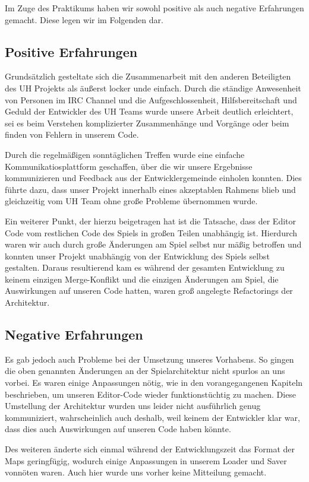 Im Zuge des Praktikums haben wir sowohl positive als auch negative Erfahrungen
gemacht. Diese legen wir im Folgenden dar.

\subsection{Positive Erfahrungen}
Grundsätzlich gesteltate sich die Zusammenarbeit mit den anderen Beteiligten
des UH Projekts als äußerst locker unde einfach. Durch die ständige Anwesenheit
von Personen im IRC Channel und die Aufgeschlossenheit, Hilfsbereitschaft und
Geduld der Entwickler des UH Teams wurde unsere Arbeit deutlich erleichtert,
sei es beim Verstehen komplizierter Zusammenhänge und Vorgänge oder beim
finden von Fehlern in unserem Code.

Durch die regelmäßigen sonntäglichen Treffen wurde eine einfache
Kommunikatiosplattform geschaffen, über die wir unsere Ergebnisse kommunizieren
und Feedback aus der Entwicklergemeinde einholen konnten. Dies führte dazu,
dass unser Projekt innerhalb eines akzeptablen Rahmens blieb und gleichzeitig
vom UH Team ohne große Probleme übernommen wurde.

Ein weiterer Punkt, der hierzu beigetragen hat ist die Tatsache, dass der
Editor Code vom restlichen Code des Spiels in großen Teilen unabhängig ist.
Hierdurch waren wir auch durch große Änderungen am Spiel selbst nur
mäßig betroffen und konnten unser Projekt unabhängig von der Entwicklung
des Spiels selbst gestalten. Daraus resultierend kam es während der gesamten
Entwicklung zu keinem einzigen Merge-Konflikt
und die einzigen Änderungen am Spiel, die Auswirkungen auf unseren Code hatten,
waren groß angelegte Refactorings der Architektur.

\subsection{Negative Erfahrungen}
Es gab jedoch auch Probleme bei der Umsetzung unseres Vorhabens.
So gingen die oben genannten Änderungen an der Spielarchitektur nicht spurlos
an uns vorbei. Es waren einige Anpassungen nötig, wie in den vorangegangenen Kapiteln
beschrieben, um unseren Editor-Code wieder funktionstüchtig zu machen.
Diese Umstellung der Architektur wurden uns leider nicht ausführlich genug
kommuniziert, wahrscheinlich auch deshalb, weil keinem der Entwickler klar war,
dass dies auch Auswirkungen auf unseren Code haben könnte.

Des weiteren änderte sich einmal während der Entwicklungszeit das Format der
Maps geringfügig, wodurch einige Anpassungen in unserem Loader und Saver vonnöten
waren. Auch hier wurde uns vorher keine Mitteilung gemacht.

